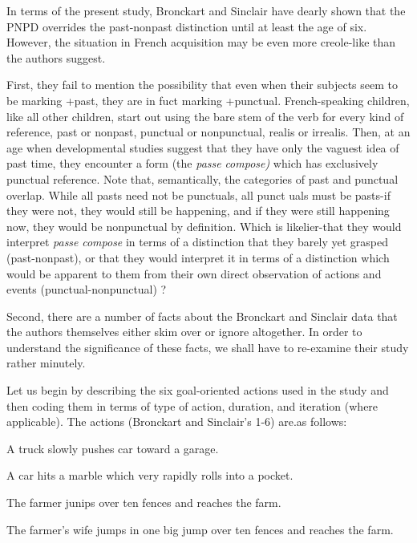 
In terms of the present study, Bronckart and Sinclair have dearly shown that the PNPD overrides the past-nonpast distinction until at least the age of six. However, the situation in French acquisi\-tion may be even more creole-like than the authors suggest.

First, they fail to mention the possibility that even when their subjects seem to be marking +past, they are in fuct marking +punctual. French-speaking children, like all other children, start out using the bare stem of the verb for every kind of reference, past or nonpast, punctual or nonpunctual, realis or irrealis. Then, at an age when devel\-opmental studies suggest that they have only the vaguest idea of past time, they encounter a form (the \textit{passe} \textit{compos}\textit{e}\textit{)} which has exclusively punctual reference. Note that, semantically, the categories of past and punctual overlap. While all pasts need not be punctuals, all punct uals must be pasts-if they were not, they would still be happening, and if they were still happening now, they would be nonpunctual by defini\-tion. Which is likelier-that they would interpret \textit{passe} \textit{compose} in terms of a distinction that they barely yet grasped (past-nonpast), or that they would interpret it in terms of a distinction which would be apparent to them from their own direct observation of actions and events (punctual-nonpunctual) ?

Second, there are a number of facts about the Bronckart and Sinclair data that the authors themselves either skim over or ignore altogether. In order to understand the significance of these facts, we shall have to re-examine their study rather minutely.

Let us begin by describing the six goal-oriented actions used in the study and then coding them in terms of type of action, duration, and iteration (where applicable). The actions (Bronckart and Sinclair's 1{}-6) are.as follows:

\ea\label{ex:16}
 A truck slowly pushes car toward a garage.
\glt
\z

\ea\label{ex:17}
 A car hits a marble which very rapidly rolls into a pocket.
\glt
\z

\ea\label{ex:18}
 The farmer junips over ten fences and reaches the farm.
\glt
\z

\ea\label{ex:19}
 The farmer's wife jumps in one big jump over ten fences and reaches the farm.
\glt
\z

